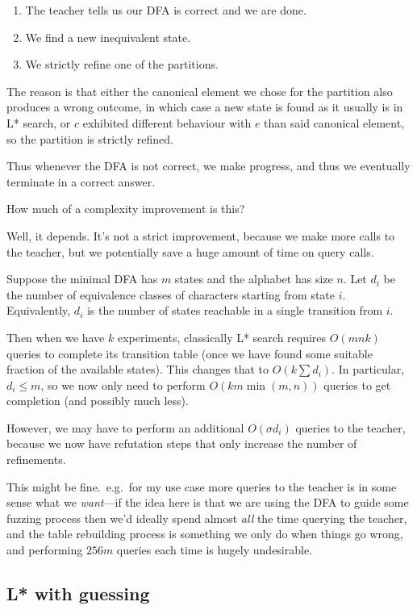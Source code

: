 \documentclass[a4paper]{book}
\begin{document}
\begin{enumerate}
\item The teacher tells us our DFA is correct and we are done.
\item We find a new inequivalent state.
\item We strictly refine one of the partitions.
\end{enumerate}

The reason is that either the canonical element we chose for the partition also produces a wrong outcome,
in which case a new state is found as it usually is in L* search,
or \(c\) exhibited different behaviour with \(e\) than said canonical element,
so the partition is strictly refined.

Thus whenever the DFA is not correct,
we make progress,
and thus we eventually terminate in a correct answer.

How much of a complexity improvement is this?

Well, it depends.
It's not a strict improvement,
because we make more calls to the teacher,
but we potentially save a huge amount of time on query calls.

Suppose the minimal DFA has \(m\) states and the alphabet has size \(n\).
Let \(d_i\) be the number of equivalence classes of characters starting from state \(i\).
Equivalently,
\(d_i\) is the number of states reachable in a single transition from \(i\).

Then when we have \(k\) experiments,
classically L* search requires \(O(mnk)\) queries to complete its transition table (once we have found some suitable fraction of the available states).
This changes that to \(O(k \sum d_i)\).
In particular,
\(d_i \leq m\),
so we now only need to perform \(O(km \min(m, n)) \) queries to get completion (and possibly much less).

However,
we may have to perform an additional \(O(\sigma d_i)\) queries to the teacher,
because we now have refutation steps that only increase the number of refinements.

This might be fine.\
e.g.\ for my use case more queries to the teacher is in some sense what we \emph{want}---if
the idea here is that we are using the DFA to guide some fuzzing process then we'd ideally spend almost \emph{all} the time querying the teacher,
and the table rebuilding process is something we only do when things go wrong,
and performing \(256 m\) queries each time is hugely undesirable.

\subsection{L* with guessing}
\end{document}
